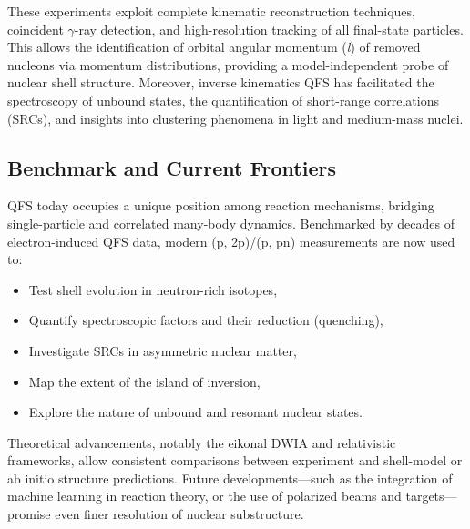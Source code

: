 These experiments exploit complete kinematic reconstruction techniques, coincident $\gamma$-ray detection, and high-resolution tracking of all final-state particles. This allows the identification of orbital angular momentum (\emph{l}) of removed nucleons via momentum distributions, providing a model-independent probe of nuclear shell structure. Moreover, inverse kinematics QFS has facilitated the spectroscopy of unbound states, the quantification of short-range correlations (SRCs), and insights into clustering phenomena in light and medium-mass nuclei.


\subsection{Benchmark and Current Frontiers}

QFS today occupies a unique position among reaction mechanisms, bridging single-particle and correlated many-body dynamics. Benchmarked by decades of electron-induced QFS data, modern (p, 2p)/(p, pn) measurements are now used to:

\begin{itemize}
	\item Test shell evolution in neutron-rich isotopes,
	\item Quantify spectroscopic factors and their reduction (quenching),
	\item Investigate SRCs in asymmetric nuclear matter,
	\item Map the extent of the island of inversion,
	\item Explore the nature of unbound and resonant nuclear states.
\end{itemize}

Theoretical advancements, notably the eikonal DWIA and relativistic frameworks, allow consistent comparisons between experiment and shell-model or ab initio structure predictions. Future developments—such as the integration of machine learning in reaction theory, or the use of polarized beams and targets—promise even finer resolution of nuclear substructure.


%



